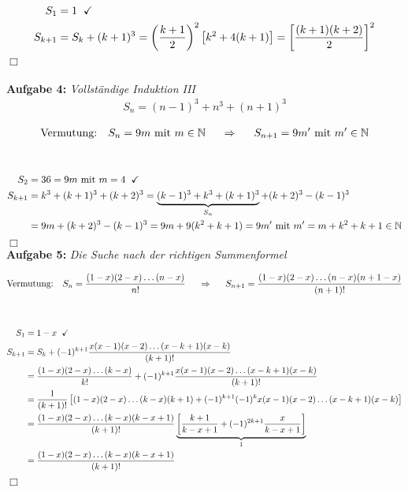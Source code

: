 \begin{align*}
S_1&=1\hspace{0.2cm}\checkmark\\
S_{k+1}&=S_k+(k+1)^3=\left(\frac{k+1}{2}\right)^2\left[k^2+4(k+1)\right]=\left[\frac{(k+1)(k+2)}{2}\right]^2
\end{align*}\hfill $\Box$\\[0.7cm]
%
\newpage
\ \\
\textbf{Aufgabe 4: } \emph{Vollständige Induktion III}
\begin{align*}
S_n=(n-1)^3+n^3+(n+1)^3
\end{align*}
\begin{minipage}{0.6\linewidth}
\begin{align*}
\text{Vermutung: }\hspace{0.2cm} S_n=9m \text{ mit }m\in\mathbb{N} \hspace{0.5cm} \Rightarrow \hspace{0.5cm} S_{n+1}=9m' \text{ mit }m'\in\mathbb{N}
\end{align*}
\end{minipage}\\
\begin{align*}
S_2&=36=9m \text{ mit }m=4\hspace{0.2cm}\checkmark\\
S_{k+1}&=k^3+(k+1)^3+(k+2)^3=\underbrace{(k-1)^3+k^3+(k+1)^3}_{S_n}+(k+2)^3-(k-1)^3\\
&=9m+(k+2)^3-(k-1)^3=9m+9(k^2+k+1)=9m' \text{ mit } m'=m+k^2+k+1\in\mathbb{N}
\end{align*}\hfill $\Box$\\[0.7cm]
%
\textbf{Aufgabe 5: } \emph{Die Suche nach der richtigen Summenformel}\\
\begin{minipage}{0.6\linewidth}
\begin{align*}
\text{Vermutung: }\hspace{0.2cm} S_n=\frac{(1-x)(2-x)\dots(n-x)}{n!} \hspace{0.5cm} \Rightarrow \hspace{0.5cm} S_{n+1}=\frac{(1-x)(2-x)\dots(n-x)(n+1-x)}{(n+1)!}
\end{align*}
\end{minipage}\\
\begin{align*}
S_1&=1-x\hspace{0.2cm}\checkmark\\
S_{k+1}&=S_k+(-1)^{k+1}\frac{x(x-1)(x-2)\dots(x-k+1)(x-k)}{(k+1)!}\\
&=\frac{(1-x)(2-x)\dots(k-x)}{k!}+(-1)^{k+1}\frac{x(x-1)(x-2)\dots(x-k+1)(x-k)}{(k+1)!}\\
&=\frac{1}{(k+1)!}\left[(1-x)(2-x)\dots(k-x)(k+1)+(-1)^{k+1}(-1)^kx(x-1)(x-2)\dots(x-k+1)(x-k)\right]\\
&=\frac{(1-x)(2-x)\dots(k-x)(k-x+1)}{(k+1)!}\underbrace{\left[\frac{k+1}{k-x+1}+(-1)^{2k+1}\frac{x}{k-x+1}\right]}_1\\
&=\frac{(1-x)(2-x)\dots(k-x)(k-x+1)}{(k+1)!}
\end{align*}\hfill $\Box$\\[0.7cm]
